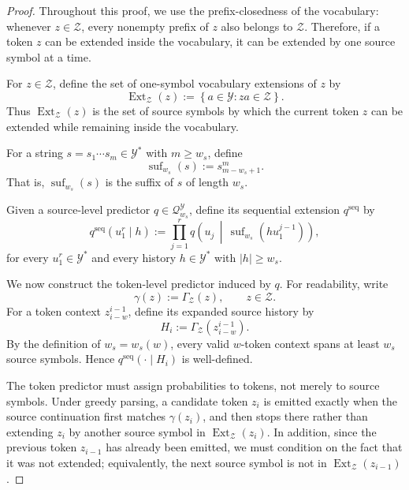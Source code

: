 \documentclass{article}
\theoremstyle{plain}
\theoremstyle{definition}
\theoremstyle{remark}
\begin{document}
    \begin{proof}
    Throughout this proof, we use the prefix-closedness of the vocabulary:
    whenever \(z\in\mathcal Z\), every nonempty prefix of \(z\) also belongs to
    \(\mathcal Z\). Therefore, if a token \(z\) can be extended inside the
    vocabulary, it can be extended by one source symbol at a time.
    
    For \(z\in\mathcal Z\), define the set of one-symbol vocabulary extensions of
    \(z\) by
    \[
        \operatorname{Ext}_{\mathcal Z}(z)
        :=
        \left\{
            a\in\mathcal Y :
            za\in\mathcal Z
        \right\}.
    \]
    Thus \(\operatorname{Ext}_{\mathcal Z}(z)\) is the set of source symbols by
    which the current token \(z\) can be extended while remaining inside the
    vocabulary.
    
    
    
    
    For a string \(s=s_1\cdots s_m\in\mathcal Y^*\) with \(m\ge w_s\), define
    \[
        \operatorname{suf}_{w_s}(s)
        :=
        s_{m-w_s+1}^m .
    \]
    That is, \(\operatorname{suf}_{w_s}(s)\) is the suffix of \(s\) of length
    \(w_s\).
    
    Given a source-level predictor \(q\in\mathcal Q_{w_s}^{\mathcal Y}\), define
    its sequential extension \(q^{\mathrm{seq}}\) by
    \[
        q^{\mathrm{seq}}(u_1^r\mid h)
        :=
        \prod_{j=1}^{r}
        q\!\left(
            u_j
            \,\middle|\,
            \operatorname{suf}_{w_s}(h u_1^{j-1})
        \right),
    \]
    for every \(u_1^r\in\mathcal Y^*\) and every history \(h\in\mathcal Y^*\) with
    \(|h|\ge w_s\).
    
    We now construct the token-level predictor induced by \(q\). For readability,
    write
    \[
        \gamma(z) := \Gamma_{\mathcal Z}(z),
        \qquad z\in\mathcal Z .
    \]
    For a token context \(z_{i-w}^{i-1}\), define its expanded source history by
    \[
        H_i
        :=
        \Gamma_{\mathcal Z}(z_{i-w}^{i-1}).
    \]
    By the definition of \(w_s=w_s(w)\), every valid \(w\)-token context spans at
    least \(w_s\) source symbols. Hence \(q^{\mathrm{seq}}(\cdot\mid H_i)\) is
    well-defined.
    
    The token predictor must assign probabilities to tokens, not merely to source
    symbols. Under greedy parsing, a candidate token \(z_i\) is emitted exactly when
    the source continuation first matches \(\gamma(z_i)\), and then stops there
    rather than extending \(z_i\) by another source symbol in
    \(\operatorname{Ext}_{\mathcal Z}(z_i)\). In addition, since the previous token
    \(z_{i-1}\) has already been emitted, we must condition on the fact that it was
    not extended; equivalently, the next source symbol is not in
    \(\operatorname{Ext}_{\mathcal Z}(z_{i-1})\).
    

\end{proof}
\end{document}
